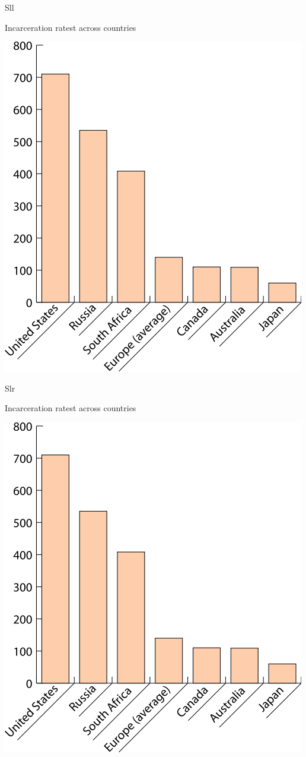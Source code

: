 \documentclass[print,Draft]{faosyb}
\begin{document}
\begin{chart}{S}{ll}
\caption{Incarceration ratest across countries}
\label{chart:incarceration}
\includegraphics[width=\chartwidth,height=\chartheight]{incarceration}  
\end{chart}

\begin{chart}{S}{lr}
\caption{Incarceration ratest across countries}
\label{chart:incarceration}
\includegraphics[width=\chartwidth,height=\chartheight]{incarceration}  
\end{chart}
\end{document}
